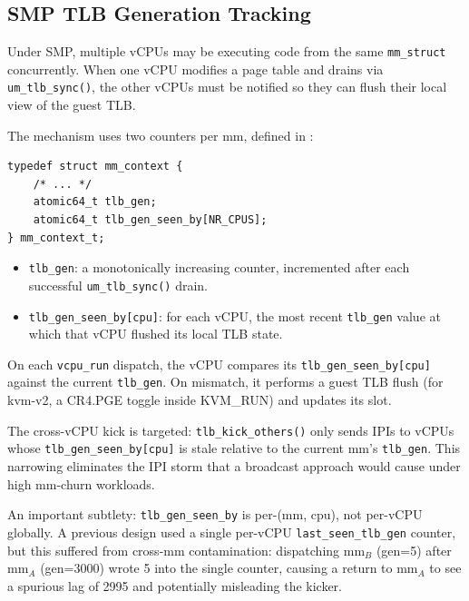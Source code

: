 \subsection{SMP TLB Generation Tracking}
\label{sec:tlb-gen}

Under SMP, multiple vCPUs may be executing code from the same
\texttt{mm\_struct} concurrently.  When one vCPU modifies a page table and
drains via \texttt{um\_tlb\_sync()}, the other vCPUs must be notified so they
can flush their local view of the guest TLB.

The mechanism uses two counters per mm, defined in
:

\begin{lstlisting}[language=KernelC, caption={Per-mm TLB generation counters
  for SMP coherence.}, label={lst:tlb-gen}]
typedef struct mm_context {
    /* ... */
    atomic64_t tlb_gen;
    atomic64_t tlb_gen_seen_by[NR_CPUS];
} mm_context_t;
\end{lstlisting}

\begin{itemize}[leftmargin=2em]
\item \texttt{tlb\_gen}: a monotonically increasing counter, incremented after
  each successful \texttt{um\_tlb\_sync()} drain.
\item \texttt{tlb\_gen\_seen\_by[cpu]}: for each vCPU, the most recent
  \texttt{tlb\_gen} value at which that vCPU flushed its local TLB state.
\end{itemize}

On each \texttt{vcpu\_run} dispatch, the vCPU compares its
\texttt{tlb\_gen\_seen\_by[cpu]} against the current \texttt{tlb\_gen}.  On
mismatch, it performs a guest TLB flush (for kvm-v2, a CR4.PGE toggle inside
KVM\_RUN) and updates its slot.

The cross-vCPU kick is targeted: \texttt{tlb\_kick\_others()} only sends IPIs
to vCPUs whose \texttt{tlb\_gen\_seen\_by[cpu]} is stale relative to the
current mm's \texttt{tlb\_gen}.  This narrowing eliminates the IPI storm that a
broadcast approach would cause under high mm-churn workloads.

An important subtlety: \texttt{tlb\_gen\_seen\_by} is per-(mm, cpu), not
per-vCPU globally.  A previous design used a single per-vCPU
\texttt{last\_seen\_tlb\_gen} counter, but this suffered from cross-mm
contamination: dispatching mm$_B$ (gen=5) after mm$_A$ (gen=3000) wrote 5 into
the single counter, causing a return to mm$_A$ to see a spurious lag of 2995
and potentially misleading the kicker.

